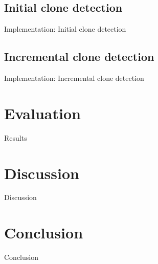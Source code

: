 \documentclass[aspectratio=1610]{beamer}
\begin{document}
\subsection{Initial clone detection}

\begin{frame}{Implementation: Initial clone detection}
\end{frame}

\subsection{Incremental clone detection}
\begin{frame}{Implementation: Incremental clone detection}
\end{frame}

\section{Evaluation}
\begin{frame}{Results}
\end{frame}

\section{Discussion}
\begin{frame}{Discussion}
\end{frame}

\section{Conclusion}
\begin{frame}{Conclusion}
\end{frame}
\end{document}
